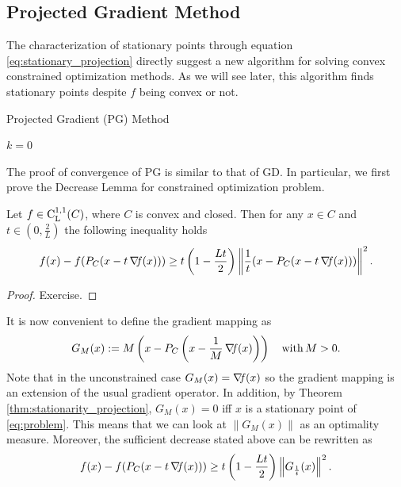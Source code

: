 \documentclass[10pt,a4paper]{article}
\begin{document}
\subsection{Projected Gradient Method}
The characterization of stationary points through equation \eqref{eq:stationary_projection} directly suggest a new algorithm for solving convex constrained optimization methods. As we will see later, this algorithm finds stationary points despite $f$ being convex or not. \\
\begin{algorithm}[H]\label{alg}
	\caption{Projected Gradient (PG) Method}
	
	
	$k = 0$
	
\end{algorithm}
The proof of convergence of PG is similar to that of GD. In particular, we first prove the Decrease Lemma for constrained optimization problem. 
\begin{lemma}
	Let $f\in \mathord{\mathrm{C^{1,1}_{L}}}(C)$, where $C$ is convex and closed. Then for any $x\in C$ and $t\in (0,\frac{2}{L})$ the following inequality holds
	\begin{equation*}
		f(x)-f(P_C(x-t\operatorname*{\mathit{\nabla \!f}}(x))) \geq t\left(1- \frac{Lt}{2}\right) \left\| \frac{1}{t}(x-P_C(x-t\operatorname*{\mathit{\nabla \!f}}(x))) \right\|^2.
	\end{equation*}
\end{lemma}
\begin{proof}
	Exercise.
\end{proof}
\noindent It is now convenient to define the gradient mapping as
\begin{equation}\label{eq:gradient}
	G_M(x) := M \left(x-P_C\left(x-\frac{1}{M}\operatorname*{\mathit{\nabla \!f}}(x)\right)\right) \quad\mathord{\mathrm{with }}\, M>0.
\end{equation}
Note that in the unconstrained case $G_M(x)=\operatorname*{\mathit{\nabla \!f}}(x)$ so the gradient mapping is an extension of the usual gradient operator. In addition, by Theorem \ref{thm:stationarity_projection}, $G_M(x) = 0$ iff $x$ is a stationary point of \eqref{eq:problem}. This means that we can look at $\|G_M(x)\|$ as an optimality measure. Moreover, the sufficient decrease stated above can be rewritten as 
\begin{equation*}
	f(x)-f(P_C(x-t\operatorname*{\mathit{\nabla \!f}}(x))) \geq t\left(1- \frac{Lt}{2}\right) \left\| G_{\frac{1}{t}} (x) \right\|^2.
\end{equation*}
\end{document}
